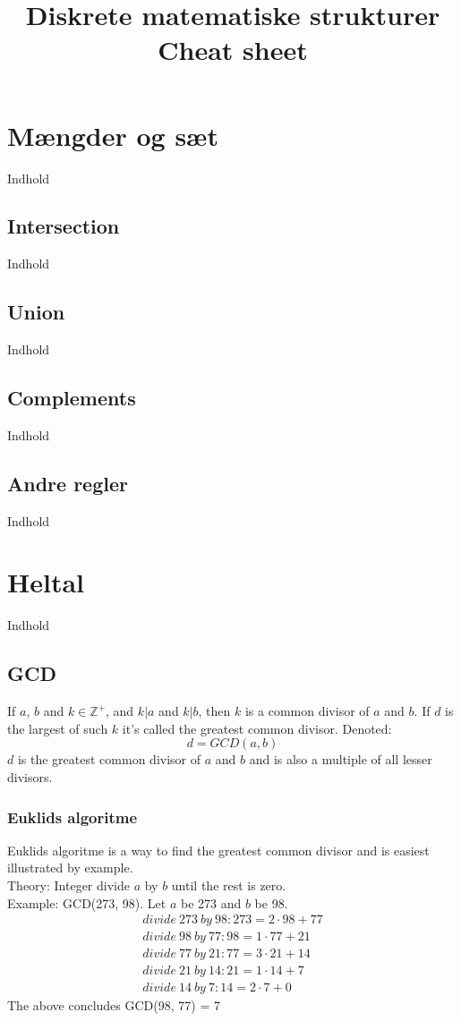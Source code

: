 \documentclass[a4paper]{article}
\title{Diskrete matematiske strukturer\\
          Cheat sheet}
\author {}
\date{}
\newcommand{\Integers}{\mathbb{Z}}
\begin{document}
\maketitle
\tableofcontents
\clearpage
\section{Mængder og sæt}
  Indhold
  \subsection{Intersection}
    Indhold
  \subsection{Union}
    Indhold
  \subsection{Complements}
    Indhold
  \subsection{Andre regler}
    Indhold
\section{Heltal}
  Indhold
  \subsection{GCD}
    If $a$, $b$ and $k \in \Integers^+$, and $k | a$ and $k | b$, then $k$ is a common divisor of $a$ and $b$. If $d$ is the largest of such $k$ it's called the greatest common divisor. Denoted:
    $$d = GCD(a, b)$$
    $d$ is the greatest common divisor of $a$ and $b$ and is also a multiple of all lesser divisors.
    \subsubsection{Euklids algoritme}
     Euklids algoritme is a way to find the greatest common divisor and is easiest illustrated by example.\\
     Theory: Integer divide $a$ by $b$ until the rest is zero.\\
     Example: GCD(273, 98). Let $a$ be 273 and $b$ be 98.
     \begin{eqnarray}
      divide\ 273\ by\ 98:	273 = 2 \cdot 98 + 77\\
      divide\ 98\ by\ 77:	98 = 1 \cdot 77 + 21\\
      divide\ 77\ by\ 21:	77 = 3 \cdot 21 + 14\\
      divide\ 21\ by\ 14:	21 = 1 \cdot 14 + 7\\
      divide\ 14\ by\ 7:	14 = 2 \cdot 7 + 0
     \end{eqnarray}
     The above concludes GCD(98, 77) = 7
\end{document}
